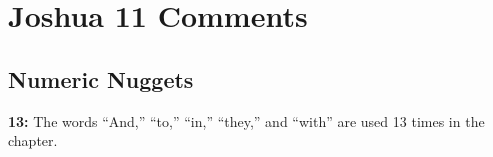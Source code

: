 \section{Joshua 11 Comments}

\subsection{Numeric Nuggets}
\textbf{13: } The words ``And,'' ``to,'' ``in,'' ``they,'' and ``with'' are used 13 times in the chapter.
